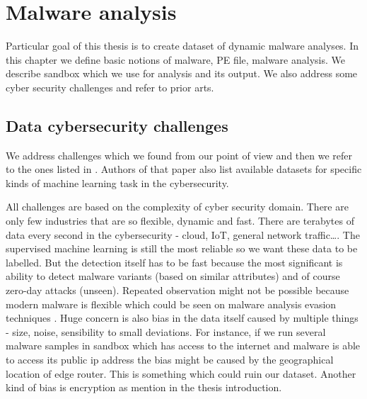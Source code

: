 


\chapter{Malware analysis} \label{chap:analysis}
Particular goal of this thesis is to create dataset of dynamic malware analyses. In this chapter we define basic notions of malware, PE file, malware analysis. We describe sandbox which we use for analysis and its output. We also address some cyber security challenges and refer to prior arts.


\section{Data cybersecurity challenges}
We address challenges which we found from our point of view and then we refer to the ones listed in \cite{Amit2019}. Authors of that paper also list available datasets for specific kinds of machine learning task in the cybersecurity.

All challenges are based on the complexity of cyber security domain. There are only few industries that are so flexible, dynamic and fast. There are terabytes of data every second in the cybersecurity - cloud, IoT, general network traffic\dots. The supervised machine learning is still the most reliable so we want these data to be labelled. But the detection itself has to be fast because the most significant is ability to detect malware variants (based on similar attributes) and of course zero-day attacks (unseen). Repeated observation might not be possible because modern malware is flexible which could be seen on malware analysis evasion techniques \cite{Afianian2018}. Huge concern is also bias in the data itself caused by multiple things - size, noise, sensibility to small deviations. For instance, if we run several malware samples in sandbox which has access to the internet and malware is able to access its public ip address the bias might be caused by the geographical location of edge router. This is something which could ruin our dataset. Another kind of bias is encryption as mention in the thesis introduction.

